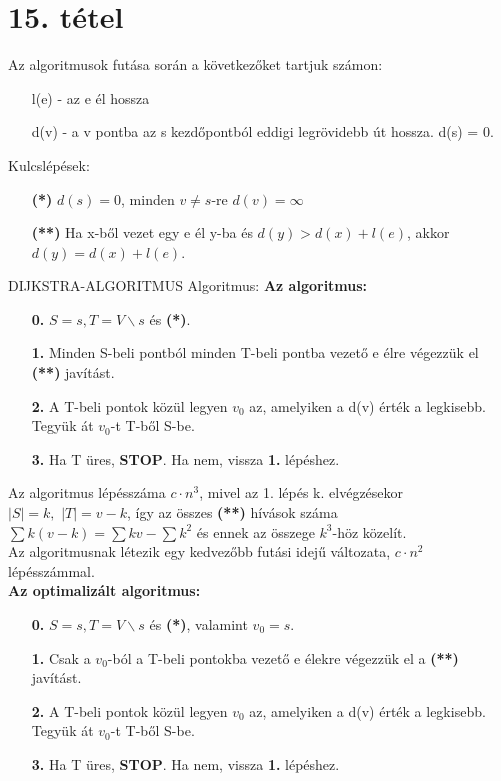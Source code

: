 \section{15. tétel}

\begin{framed}
Az algoritmusok futása során a következőket tartjuk számon:
\begin{itemize}
\item[] l(e) - az e él hossza
\item[] d(v) - a v pontba az s kezdőpontból eddigi legrövidebb út hossza. d(s) = 0.
\end{itemize}
Kulcslépések:
\begin{itemize}
\item[\textbf{(*)}]$d(s) = 0$, minden $v \neq s$-re $d(v) = \infty$
\item[\textbf{(**)}]Ha x-ből vezet egy e él y-ba és $d(y) > d(x) + l(e)$, akkor $d(y) = d(x) + l(e)$.
\end{itemize}
\end{framed}
\begin{framed}
DIJKSTRA-ALGORITMUS Algoritmus:
\textbf{Az algoritmus:}
\begin{itemize}
\item[\textbf{0.}] $S = {s}, T = V\backslash {s}$ és \textbf{(*)}.
\item[\textbf{1.}] Minden S-beli pontból minden T-beli pontba vezető e élre végezzük el \textbf{(**)} javítást.
\item[\textbf{2.}] A T-beli pontok közül legyen $v_0$ az, amelyiken a d(v) érték a legkisebb. Tegyük át $v_0$-t T-ből S-be.
\item[\textbf{3.}] Ha T üres, \textbf{STOP}. Ha nem, vissza \textbf{1.} lépéshez.
\end{itemize}
Az algoritmus lépésszáma $c\cdot n^3$, mivel az 1. lépés k. elvégzésekor $|S| = k,\,\, |T| = v - k$, így az összes \textbf{(**)} hívások száma $\sum k(v-k) = \sum kv - \sum k^2$ és ennek az összege $k^3$-höz közelít.\\Az algoritmusnak létezik egy kedvezőbb futási idejű változata, $c\cdot n^2$ lépésszámmal.\\
\textbf{Az optimalizált algoritmus:}
\begin{itemize}
\item[\textbf{0.}] $S = {s}, T = V\backslash {s}$ és \textbf{(*)}, valamint $v_0 = s$.
\item[\textbf{1.}] Csak a $v_0$-ból a T-beli pontokba vezető e élekre végezzük el a \textbf{(**)} javítást.
\item[\textbf{2.}] A T-beli pontok közül legyen $v_0$ az, amelyiken a d(v) érték a legkisebb. Tegyük át $v_0$-t T-ből S-be.
\item[\textbf{3.}] Ha T üres, \textbf{STOP}. Ha nem, vissza \textbf{1.} lépéshez.
\end{itemize}
\end{framed}
